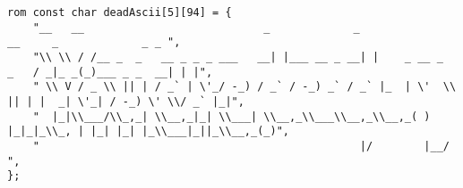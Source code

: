 \begin{lstlisting}
rom const char deadAscii[5][94] = {
	"__   __                            _             _                  __     _             _ _ ",
	"\\ \\ / /__ _  _   __ _ _ _ ___   __| |___ __ _ __| |    _ __ _  _   / _|_ _(_)___ _ _  __| | |",
	" \\ V / _ \\ || | / _` | \'_/ -_) / _` / -_) _` / _` |_  | \'  \\ || | |  _| \'_| / -_) \' \\/ _` |_|",
	"  |_|\\___/\\_,_| \\__,_|_| \\___| \\__,_\\___\\__,_\\__,_( ) |_|_|_\\_, | |_| |_| |_\\___|_||_\\__,_(_)",
	"                                                  |/        |__/                             ",
};


\end{lstlisting}

